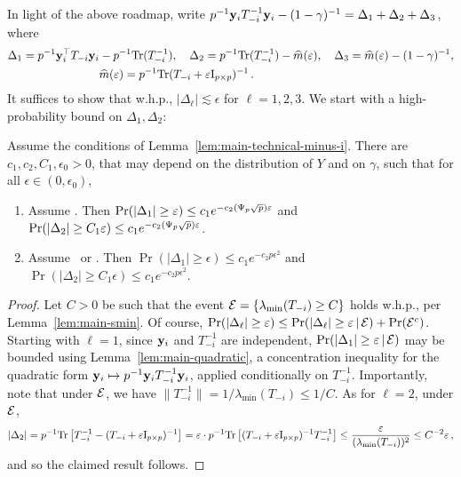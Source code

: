 \documentclass[times,sort&compress,3p]{elsarticle}
\begin{document}
In light of the above roadmap, write $p^{-1}{\bf y}_iT_{-i}^{-1}{\bf y}_i - (1-\gamma)^{-1} = \Delta_1 + \Delta_2 + \Delta_3$,
where
\begin{equation}
    \begin{split}
        \Delta_1 = p^{-1}{\bf y}_i^\top T_{-i}{\bf y}_i &- p^{-1}\textrm{Tr}(T_{-i}^{-1}),\quad \Delta_2 = p^{-1}\textrm{Tr}(T_{-i}^{-1}) - \widehat{m}(\varepsilon),\quad \Delta_3=\widehat{m}(\varepsilon)-(1-\gamma)^{-1},\\
        &\widehat{m}(\varepsilon) = p^{-1}\textrm{Tr}(T_{-i} + \varepsilon\mathrm{I}_{p \times p})^{-1} \,.
    \end{split}
\end{equation}
It suffices to show that w.h.p., $|\Delta_\ell|\lesssim \epsilon$ for $\ell=1,2,3$. We start with a high-probability bound on $\Delta_1,\Delta_2$:
\begin{lemma}\label{lem:main-technical-helper1}
    Assume the conditions of Lemma~\ref{lem:main-technical-minus-i}.
    There are $c_1,c_2,C_1,\epsilon_0>0$, that may depend on the distribution of $Y$ and on $\gamma$, such that for all $\epsilon\in (0,\epsilon_0)$,
    \begin{enumerate}
        \item Assume \AssumLC. Then $\Pr(|\Delta_1|\ge \varepsilon) \le c_1e^{-c_2(\Psi_p\sqrt{p})\varepsilon}$ and $\Pr(|\Delta_2|\ge C_1\varepsilon) \le c_1e^{-c_2(\Psi_p\sqrt{p})\varepsilon}$.
        \item Assume \AssumIndep~or \AssumCCPSB. Then $\Pr(|\Delta_1|\ge \epsilon) \le c_1e^{-c_2p\epsilon^2}$ and $\Pr(|\Delta_2|\ge C_1\epsilon) \le c_1e^{-c_2p\epsilon^2}$.
    \end{enumerate}
\end{lemma}
\begin{proof}
    Let $C>0$ be such that the event $\mathcal{E}=\{\lambda_{\min}(T_{-i})\ge C\}$ holds w.h.p., per Lemma~\ref{lem:main-smin}. Of course, $\Pr(|\Delta_\ell|\ge \varepsilon) \le \Pr(|\Delta_\ell|\ge \varepsilon\,|\,\mathcal{E}) + \Pr(\mathcal{E}^c)$. Starting with $\ell=1$,
    since ${\bf y}_i$ and $T_{-i}^{-1}$ are independent, 
    $\Pr(|\Delta_1|\ge \varepsilon\,|\,\mathcal{E})$ may be bounded using Lemma~\ref{lem:main-quadratic}, a concentration inequality for the
    quadratic form ${\bf y}_i \mapsto p^{-1}{\bf y}_iT_{-i}^{-1}{\bf y}_i$, applied conditionally on $T_{-i}^{-1}$. Importantly, note that 
    under $\mathcal{E}$, we have $\|T_{-i}^{-1}\|=1/\lambda_{\min}(T_{-i})\le 1/C$. As for $\ell=2$, under $\mathcal{E}$,
    \[
    |\Delta_2| = p^{-1}\textrm{Tr}\left[ T_{-i}^{-1}-(T_{-i}+\varepsilon\mathrm{I}_{p \times p})^{-1}  \right] = \varepsilon \cdot p^{-1}   \textrm{Tr}\left[ (T_{-i}+\varepsilon\mathrm{I}_{p \times p})^{-1}T_{-i}^{-1}  \right] \le \frac{\varepsilon}{(\lambda_{\min}(T_{-i}))^2} \le C^{-2}\varepsilon \,,
    \]
    and so the claimed result follows.
\end{proof}
\end{document}
